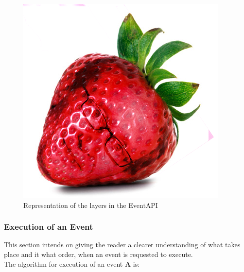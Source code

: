 \begin{figure}[h!]
\centering
\includegraphics[width=0.3\linewidth]{figures/strawberry}
\caption{\label{fig:EventAPILayer}  Representation of the layers in the EventAPI}
\end{figure}

\subsubsection{Execution of an Event}
This section intends on giving the reader a clearer understanding of what takes place and it what order, when an event is requested to execute.\\

The algorithm for execution of an event \textbf{A} is:

